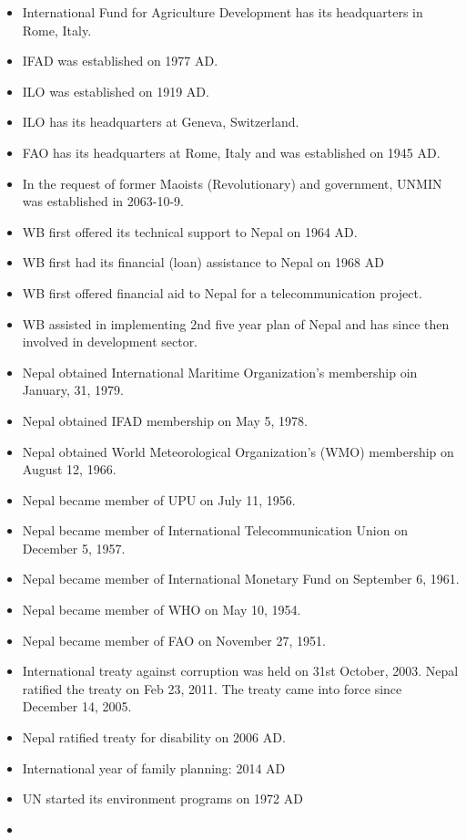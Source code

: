 \documentclass[
  openany]{book}
\begin{document}
\begin{itemize}
\item
  International Fund for Agriculture Development has its headquarters in Rome, Italy.
\item
  IFAD was established on 1977 AD.
\item
  ILO was established on 1919 AD.
\item
  ILO has its headquarters at Geneva, Switzerland.
\item
  FAO has its headquarters at Rome, Italy and was established on 1945 AD.
\item
  In the request of former Maoists (Revolutionary) and government, UNMIN was established in 2063-10-9.
\item
  WB first offered its technical support to Nepal on 1964 AD.
\item
  WB first had its financial (loan) assistance to Nepal on 1968 AD
\item
  WB first offered financial aid to Nepal for a telecommunication project.
\item
  WB assisted in implementing 2nd five year plan of Nepal and has since then involved in development sector.
\item
  Nepal obtained International Maritime Organization's membership oin January, 31, 1979.
\item
  Nepal obtained IFAD membership on May 5, 1978.
\item
  Nepal obtained World Meteorological Organization's (WMO) membership on August 12, 1966.
\item
  Nepal became member of UPU on July 11, 1956.
\item
  Nepal became member of International Telecommunication Union on December 5, 1957.
\item
  Nepal became member of International Monetary Fund on September 6, 1961.
\item
  Nepal became member of WHO on May 10, 1954.
\item
  Nepal became member of FAO on November 27, 1951.
\item
  International treaty against corruption was held on 31st October, 2003. Nepal ratified the treaty on Feb 23, 2011. The treaty came into force since December 14, 2005.
\item
  Nepal ratified treaty for disability on 2006 AD.
\item
  International year of family planning: 2014 AD
\item
  UN started its environment programs on 1972 AD
\item

\end{itemize}
\end{document}
